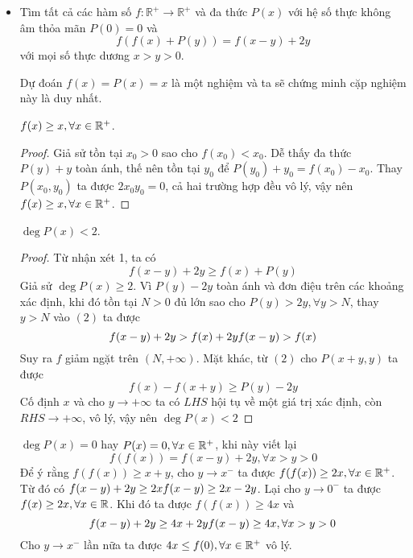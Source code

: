 \documentclass[11pt]{scrartcl}
\begin{document}
\begin{itemize}[label=, leftmargin=0em, itemsep=0.5em]
\begin{sol}
\begin{proof}
        \end{proof}
        Lại có từ $f(x^2) = g(x)^2 \ra f(x) \geq 0 \forall x \geq $. Nên theo , suy ra $f(x) = ax, \xr$. Thử lại tìm được $a = 1$ và $f(x) = x$.

        Vậy cặp hàm số thỏa mãn là $\boxed{f(x) = x, g(x) = x, \xr}$.
    \end{sol}

    \item \begin{bt}
        Tìm tất cả các hàm số $f : \mathbb{R}^+ \to \mathbb{R}^+$ và đa thức $P(x)$ với hệ số thực không âm thỏa mãn $P(0) = 0$ và \[f(f(x) + P(y)) = f(x - y) + 2y\] với mọi số thực dương $x > y > 0$.
    \end{bt}
    \begin{sol}
        Dự đoán $f(x) = P(x) = x$ là một nghiệm và ta sẽ chứng minh cặp nghiệm này là duy nhất.

         $f(x) \geq x, \forall x\in \mathbb{R^+}$. 
        \begin{proof}
            Giả sử tồn tại $x_0 > 0$ sao cho $f(x_0) < x_0$. Dễ thấy đa thức $P(y) + y$ toàn ánh, thế nên tồn tại $y_0$ để $P(y_0) + y_0 = f(x_0) - x_0$. Thay $P(x_0,y_0)$ ta được $2x_0y_0 = 0$, cả hai trường hợp đều vô lý, vậy nên $f(x) \geq x, \forall x\in \mathbb{R^+}$.
        \end{proof}

         $\deg P(x) < 2$. 
        \begin{proof}
            Từ nhận xét 1, ta có 
        \[
            f(x - y)  + 2y \geq f(x) + P(y)\tag{2}
        \]
        Giả sử $\deg P(x) \geq 2$. Vì $P(y) - 2y$ toàn ánh và đơn điệu trên các khoảng xác định, khi đó tồn tại $N > 0$ đủ lớn sao cho $P(y) > 2y, \forall y > N$, thay $y > N$ vào $(2)$ ta được 
        \[
            f(x - y) + 2y > f(x) + 2y \lra f(x - y) > f(x)
        \]
        Suy ra $f$ giảm ngặt trên $(N, +\infty)$. Mặt khác, từ $(2)$ cho $P(x + y,y)$ ta được 
        \[
            f(x)  - f(x + y) \geq  P(y) -2y
        \]
        Cố định $x$ và cho $y \to +\infty$ ta có $LHS$ hội tụ về một giá trị xác định, còn $RHS \to +\infty$, vô lý, vậy nên $\deg P(x) < 2$
        \end{proof}
         $\deg P(x) = 0$ hay $P(x) = 0, \forall x\in \mathbb{R^+}$, khi này viết lại 
        \[
            f(f(x)) = f(x - y) + 2y, \forall x > y > 0\tag{1}
        \]
        Để ý rằng $f(f(x)) \geq x + y$, cho $y \to x^-$ ta được $f(f(x)) \geq 2x, \forall x\in \mathbb{R^+}$. Từ đó có $f(x - y) + 2y \geq 2x \lra f(x - y) \geq 2x - 2y$. Lại cho $y \to 0^-$ ta được $f(x) \geq 2x, \forall x\in \mathbb{R}$. Khi đó ta được $f(f(x)) \geq 4x$ và 
        \[
            f( x- y) + 2y \geq 4x + 2y \lra f(x - y) \geq 4x, \forall x > y > 0
        \]
        Cho $y \to x^-$ lần nữa ta được $4x \leq f(0), \forall x\in \mathbb{R^+}$ vô lý.
        

\end{sol}
\end{itemize}
\end{document}
